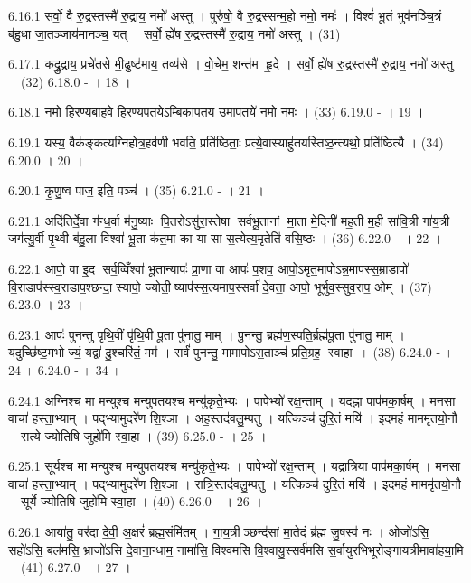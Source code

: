 6.16.1
सर्वो॒ वै रु॒द्रस्तस्मै॑ रु॒द्राय॒ नमो॑ अस्तु । पुरु॑षो॒ वै रु॒द्रस्सन्म॒हो नमो॒ नमः॑ । विश्वं॑ भू॒तं भुव॑नञ्चि॒त्रं ब॑हु॒धा जा॒तञ्जाय॑मानञ्च॒ यत् । सर्वो॒ ह्ये॑ष रु॒द्रस्तस्मै॑ रु॒द्राय॒ नमो॑ अस्तु । (31)
\anuvakamend

6.17.1
कद्रु॒द्राय॒ प्रचे॑तसे मी॒ढुष्ट॑माय॒ तव्य॑से । वो॒चेम॒ शन्त॑म हृ॒दे । सर्वो॒ ह्ये॑ष रु॒द्रस्तस्मै॑ रु॒द्राय॒ नमो॑ अस्तु । (32)
6.18.0
- । 18 ।
\anuvakamend

6.18.1
नमो हिरण्यबाहवे हिरण्यपतयेऽम्बिकापतय उमापतये॑ नमो॒ नमः । (33)
6.19.0
- । 19 ।
\anuvakamend

6.19.1
यस्य॒ वैक॑ङ्कत्यग्निहोत्र॒हव॑णी भवति॒ प्रति॑ष्ठिताः॒ प्रत्ये॒वास्याहु॑तयस्तिष्ठ॒न्त्यथो॒ प्रति॑ष्ठित्यै । (34)
6.20.0
। 20 ।
\anuvakamend

6.20.1
कृ॒णु॒ष्व पाज॒ इति॒ पञ्च॑ । (35)
6.21.0
- । 21 ।
\anuvakamend

6.21.1
अदि॑तिर्दे॒वा ग॑न्ध॒र्वा म॑नु॒ष्याः पि॒तरोऽसु॑रा॒स्तेषा सर्वभू॒तानां मा॒ता मे॒दिनी॑ मह॒ती म॒ही सा॑वि॒त्री गा॑य॒त्री जग॑त्यु॒र्वी पृ॒थ्वी ब॑हु॒ला विश्वा॑ भू॒ता क॑त॒मा का या सा स॒त्येत्य॒मृतेति॑ वसि॒ष्ठः । (36)
6.22.0
- । 22 ।
\anuvakamend

6.22.1
आपो॒ वा इ॒द सर्व॒व्विँश्वा॑ भू॒तान्यापः॑ प्रा॒णा वा आपः॑ प॒शव॒ आपो॒ऽमृत॒मापोऽन्न॒माप॑स्स॒म्राडापो॑ वि॒राडाप॑स्स्व॒राडाप॒श्छन्दा॒स्यापो॒ ज्योती॒ष्याप॑स्स॒त्यमाप॒स्सर्वा॑ दे॒वता॒ आपो॒ भूर्भुव॒स्सुव॒राप॒ ओम् । (37)
6.23.0
। 23 ।
\anuvakamend

6.23.1
आपः॑ पुनन्तु पृथि॒वीं पृ॑थि॒वी पू॒ता पु॑नातु॒ माम् । पु॒नन्तु॒ ब्रह्म॑ण॒स्पति॒र्ब्रह्म॑पू॒ता पु॑नातु॒ माम् । यदुच्छि॑ष्ट॒मभोज्यं॒ यद्वा॑ दु॒श्चरि॑तं॒ मम॑ । सर्वं॑ पुनन्तु॒ मामापो॑ऽस॒ताञ्च॑ प्रति॒ग्रह॒ स्वाहा । (38)
6.24.0
- । 24 ।
6.24.0
- । 34 ।
\anuvakamend

6.24.1
अग्निश्च मा मन्युश्च मन्युपतयश्च मन्यु॑कृते॒भ्यः । पापेभ्यो॑ रक्ष॒न्ताम् । यदह्ना पाप॑मका॒र्\mbox{}षम् । मनसा वाचा॑ हस्ता॒भ्याम् । पद्भ्यामुदरे॑ण शि॒श्ञा । अह॒स्तद॑वलु॒म्पतु । यत्किञ्च॑ दुरि॒तं मयि॑ । इदमहं माममृ॑तयो॒नौ । सत्ये ज्योतिषि जुहो॑मि स्वा॒हा । (39)
6.25.0
- । 25 ।
\anuvakamend

6.25.1
सूर्यश्च मा मन्युश्च मन्युपतयश्च मन्यु॑कृते॒भ्यः । पापेभ्यो॑ रक्ष॒न्ताम् । यद्रात्रिया पाप॑मका॒र्\mbox{}षम् । मनसा वाचा॑ हस्ता॒भ्याम् । पद्भ्यामुदरे॑ण शि॒श्ञा । रात्रि॒स्तद॑वलु॒म्पतु । यत्किञ्च॑ दुरि॒तं मयि॑ । इदमहं माममृ॑तयो॒नौ । सूर्ये ज्योतिषि जुहो॑मि स्वा॒हा । (40)
6.26.0
- । 26 ।
\anuvakamend

6.26.1
आया॑तु॒ वर॑दा दे॒वी॒ अ॒क्षरं॑ ब्रह्म॒संमि॑तम् । गा॒य॒त्रीञ्छन्द॑सां मा॒तेदं ब्र॑ह्म जु॒षस्व॑ नः । ओजो॑ऽसि॒ सहो॑ऽसि॒ बल॑मसि॒ भ्राजो॑ऽसि दे॒वाना॒न्धाम॒ नामा॑सि॒ विश्व॑मसि वि॒श्वायु॒स्सर्व॑मसि स॒र्वायुरभिभूरोङ्गायत्रीमावा॑हया॒मि । (41)
6.27.0
- । 27 ।
\anuvakamend

